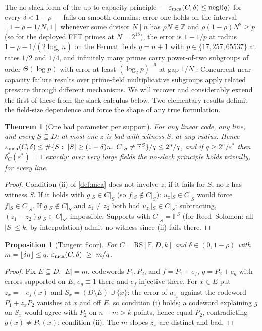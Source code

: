 \documentclass[11pt]{article}
\newtheorem{theorem}{Theorem}[section]
\newtheorem{proposition}[proposition]{Proposition}
\theoremstyle{definition}
\newcommand{\F}{\mathbb F}
\newcommand{\Z}{\mathbb Z}
\newcommand{\eps}{\varepsilon}
\newcommand{\RS}{\mathrm{RS}}
\newcommand{\emca}{\eps_{\rm mca}}
\begin{document}
The no-slack form of the up-to-capacity principle --- $\emca(C,\delta)\le\mathrm{negl}(q)$ for every $\delta<1-\rho$ --- fails on smooth domains: error one holds on the interval $[1-\rho-1/N,1]$ whenever some divisor $N\mid n$ has $\rho N\in\Z$ and $\rho(1-\rho)N^2\ge p$ (so for the deployed FFT primes at $N=2^{18}$), the error is $1-1/p$ at radius $1-\rho-1/(2\log_2n)$ on the Fermat fields $q=n+1$ with $p\in\{17,257,65537\}$ at rates $1/2$ and $1/4$, and infinitely many primes carry power-of-two subgroups of order $\Theta(\log p)$ with error at least $(\log_2p)^{-6}$ at gap $1/N$ \cite{NoSlack}.  Concurrent near-capacity failure results over prime-field multiplicative subgroups \cite{KKH26,Kambire26} apply related pressure through different mechanisms.  We will recover and considerably extend the first of these from the slack calculus below.  Two elementary results delimit the field-size dependence and force the shape of any true formulation.

\begin{theorem}[One bad parameter per support]\label{thm:onez}
For any linear code, any line, and every $S\subseteq D$: at most one $z$ is bad with witness $S$, at any radius.  Hence $\emca(C,\delta)\le\#\{S:\ |S|\ge(1-\delta)n,\ C|_S\ne\F^S\}/q\le2^n/q$, and if $q\ge2^n/\eps^*$ then $\delta^*_C(\eps^*)=1$ exactly: over very large fields the no-slack principle holds trivially, for every line.
\end{theorem}

\begin{proof}
Condition (ii) of \cref{def:mca} does not involve $z$; if it fails for $S$, no $z$ has witness $S$.  If it holds with $g|_S\in C|_S$ (so $f|_S\notin C|_S$): $u_z|_S\in C|_S$ would force $f|_S\in C|_S$.  If $g|_S\notin C|_S$ and $z_1\ne z_2$ both had $u_{z_i}|_S\in C|_S$: subtracting, $(z_1-z_2)g|_S\in C|_S$, impossible.  Supports with $C|_S=\F^S$ (for Reed--Solomon: all $|S|\le k$, by interpolation) admit no witness since (ii) fails there.
\end{proof}

\begin{proposition}[Tangent floor]\label{prop:floor}
For $C=\RS[\F,D,k]$ and $\delta\in(0,1-\rho)$ with $m=\lfloor\delta n\rfloor\le q$:
$\emca(C,\delta)\ \ge\ m/q$.
\end{proposition}

\begin{proof}
Fix $E\subseteq D$, $|E|=m$, codewords $P_1,P_2$, and $f=P_1+e_f$, $g=P_2+e_g$ with errors supported on $E$, $e_g\equiv1$ there and $e_f$ injective there.  For $x\in E$ put $z_x=-e_f(x)$ and $S_x=(D\setminus E)\cup\{x\}$: the error of $u_{z_x}$ against the codeword $P_1+z_xP_2$ vanishes at $x$ and off $E$, so condition (i) holds; a codeword explaining $g$ on $S_x$ would agree with $P_2$ on $n-m>k$ points, hence equal $P_2$, contradicting $g(x)\ne P_2(x)$: condition (ii).  The $m$ slopes $z_x$ are distinct and bad.
\end{proof}
\end{document}
